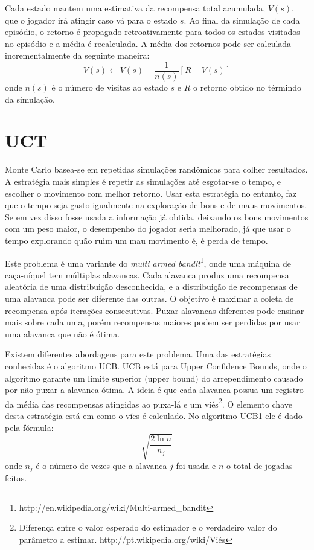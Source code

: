 Cada estado mantem uma estimativa da recompensa total acumulada, $V(s)$, que o jogador irá atingir caso vá para o estado $s$. Ao final da simulação de cada episódio, o retorno é propagado retroativamente para todos os estados visitados no episódio e a média é recalculada. A média dos retornos pode ser calculada incrementalmente da seguinte maneira:
\begin{equation}
V(s) \leftarrow V(s) + \frac{1}{n(s)}[R - V(s)]
\end{equation}
onde $n(s)$ é o número de visitas ao estado $s$ e $R$ o retorno obtido no términdo da simulação. 

\section{UCT}
Monte Carlo basea-se em repetidas simulações randômicas para colher resultados. A estratégia mais simples é repetir as simulações até esgotar-se o tempo, e escolher o movimento com melhor retorno. Usar esta estratégia no entanto, faz que o tempo seja gasto igualmente na exploração de bons e de maus movimentos. Se em vez disso fosse usada a informação já obtida, deixando os bons movimentos com um peso maior, o desempenho do jogador seria melhorado, já que usar o tempo explorando quão ruim um mau movimento é, é perda de tempo. 

Este problema é uma variante do \textit{multi armed bandit}\footnote{http://en.wikipedia.org/wiki/Multi-armed\_bandit}, onde uma máquina de caça-níquel tem múltiplas alavancas. Cada alavanca produz uma recompensa aleatória de uma distribuição desconhecida, e a distribuição de recompensas de uma alavanca pode ser diferente das outras. O objetivo é maximar a coleta de recompensa após iterações consecutivas. Puxar alavancas diferentes pode ensinar mais sobre cada uma, porém recompensas maiores podem ser perdidas por usar uma alavanca que não é ótima.

Existem diferentes abordagens para este problema. Uma das estratégias conhecidas é o algoritmo UCB\cite{ucb}. UCB está para Upper Confidence Bounds, onde o algoritmo garante um limite superior (upper bound) do arrependimento causado por não puxar a alavanca ótima. A ideia é que cada alavanca possua um registro da média das recompensas atingidas ao puxa-lá e um viés\footnote{Diferença entre o valor esperado do estimador e o verdadeiro valor do parâmetro a estimar. http://pt.wikipedia.org/wiki/Viés}. O elemento chave desta estratégia está em como o víes é calculado. No algoritmo UCB1 ele é dado pela fórmula:
\begin{equation}
\sqrt{\frac{2\ln n}{n_{j}}}
\end{equation}
onde $n_{j}$ é o número de vezes que a alavanca $j$ foi usada e $n$ o total de jogadas feitas. 

